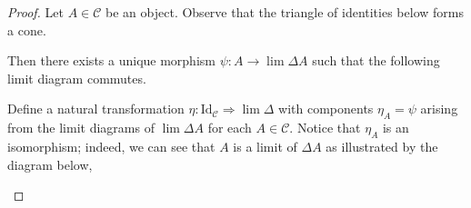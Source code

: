 \documentclass[ 12pt ]{article}
\begin{document}
\begin{enumerate}
\begin{proof}
			Let $A \in \mathscr{C}$ be an object. Observe that the triangle of identities below forms a cone.
			\begin{center}
			\end{center}
			Then there exists a unique morphism $\psi : A \to \lim \Delta A$ such that the following limit diagram commutes.
			\begin{center}
			\end{center}
			Define a natural transformation $\eta : \mathrm{Id}_\mathscr{C} \Rightarrow \lim \Delta$ with components $\eta_A = \psi$ arising from the limit diagrams of $\lim \Delta A$ for each $A \in \mathscr{C}$. Notice that $\eta_A$ is an isomorphism; indeed, we can see that $A$ is a limit of $\Delta A$ as illustrated by the diagram below,
			\begin{center}
\end{center}
\end{proof}
\end{enumerate}
\end{document}
